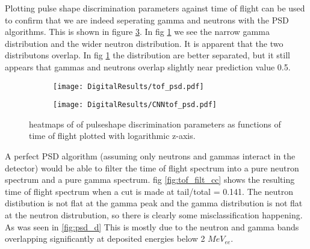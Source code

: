 \documentclass[main.tex]{subfiles}
\begin{document}
Plotting pulse shape discrimination parameters against time of flight can be used to confirm that we are indeed seperating gamma and neutrons with the PSD algorithms. This is shown in figure \ref{fig:tof_cc_tof_cnn}. In fig \ref{fig:tof_digi_cc} we see the narrow gamma distribution and the wider neutron distribution. It is apparent that the two distributons overlap. In fig \ref{fig:tof_digi_cc} the distribution are better separated, but it still appears that gammas and neutrons overlap slightly near prediction value 0.5.
\begin{figure}
    \centering
    \begin{subfigure}[ht]{\textwidth}
        \texttt{[image: DigitalResults/tof\_psd.pdf]}
        \caption{}
        \label{fig:tof_digi_cc}
    \end{subfigure}
	\begin{subfigure}[ht]{\textwidth}
        \texttt{[image: DigitalResults/CNNtof\_psd.pdf]}
        \caption{}
        \label{fig:tof_digi_cnn}
    \end{subfigure}
    \caption{heatmaps of of pulseshape discrimination parameters as functions of time of flight plotted with logarithmic z-axis.}
    \label{fig:tof_cc_tof_cnn}
\end{figure}

A perfect PSD algorithm (assuming only neutrons and gammas interact in the detector) would be able to filter the time of flight spectrum into a pure neutron spectrum and a pure gamma spectrum. fig \ref{fig:tof_filt_cc} shows the resulting time of flight spectrum when a cut is made at tail/total = 0.141. The neutron distibution is not flat at the gamma peak and the gamma distribution is not flat at the neutron distrubution, so there is clearly some misclassification happening. As was seen in \ref{fig:psd_d} This is mostly due to the neutron and gamma bands overlapping significantly at deposited energies below 2 $MeV_{ee}$.
\end{document}
